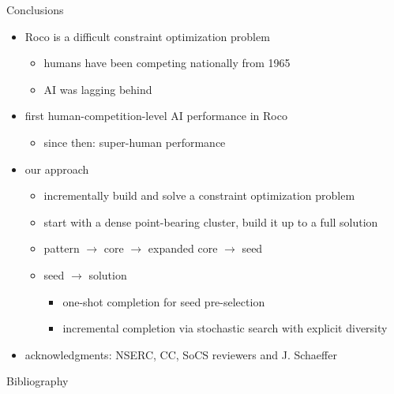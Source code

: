 \documentclass[aspectratio=169,usenames,dvipsnames]{beamer}
\newcommand{\tcb}[1]{\textcolor{m1}{#1}}
\newcommand{\bei}{\begin{itemize}}
\newcommand{\eei}{\end{itemize}}
\newcommand{\ie}{\item}
\numberwithin{equation}{section}
\numberwithin{theorem}{section}
\numberwithin{lem}{section}
\numberwithin{df}{section}
\begin{document}
\begin{frame}{Conclusions}

\bei

\ie {\sc Roco} is a difficult constraint optimization problem
\bei
\ie humans have been competing nationally from 1965
\ie AI was lagging behind
\eei

\medskip

\ie first human-competition-level AI performance in {\sc Roco}
\bei
\ie since then: super-human performance
\eei

\medskip

\ie our approach
\bei
\ie incrementally build and solve a constraint optimization problem
\ie start with a dense point-bearing cluster, build it up to a full solution
\ie pattern $\rightarrow$ core $\rightarrow$ expanded core $\rightarrow$ seed
\ie seed $\to$ solution
\bei
\ie one-shot completion for seed pre-selection
\ie incremental completion via stochastic search with explicit diversity 
\eei
\eei

\medskip
\medskip


\ie \tcb{acknowledgments: NSERC, CC, SoCS reviewers and J. Schaeffer}

\eei


\end{frame}


\begin{frame}[allowframebreaks]{Bibliography}
\renewcommand*{\bibfont}{\footnotesize}
\printbibliography
\end{frame}

\end{document}
